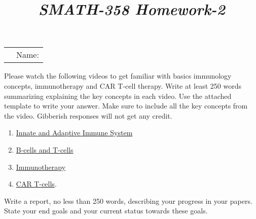 \documentclass[12pt]{exam}        %
\begin{document}
\title{\vspace{-0.5in}\textit{SMATH-358 Homework-2}}
\date{\vspace{-60pt}}

\maketitle
\begin{center}
  \begin{tabular}[c]{ll}
    &Name: \underline{\phantom{----------------------------------------------------------}}
\end{tabular}
\end{center}



\begin{questions} 

\question Please watch the following videos to get familiar with basics immunology concepts, immunotherapy and CAR T-cell therapy. Write at least 250 words summarizing explaining the key concepts in each video. Use the attached template to write your answer. Make sure to include all the key concepts from the video. Gibberish responses will not get any credit. 

\begin{enumerate}
\item \href{https://youtu.be/k9QAyP3bYmc}{Innate and Adaptive Immune System}
\item \href{https://youtu.be/rIrjO3q4Y9c}{B-cells and T-cells}
\item \href{https://youtu.be/UbFjiWOBErA}{Immunotherapy}
\item \href{https://youtu.be/OadAW99s4Ik}{CAR T-cells}.


\end{enumerate}

 

\question Write a report, no less than 250 words, describing your progress in your papers. State your end goals and your current status towards these goals.  



\end{questions}
\end{document}
